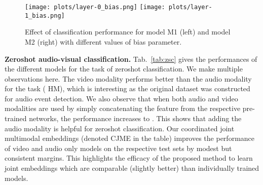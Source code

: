 \begin{figure}
\centering
	\texttt{[image: plots/layer-0\_bias.png]}
	\texttt{[image: plots/layer-1\_bias.png]}
\caption{Effect of classification performance for model M1 (left) and model M2 (right) with different values of bias parameter.
}
\label{fig:bias_corr}
\end{figure}
\begin{table}
\centering
{}
\caption{Zeroshot classification performances (\% mAcc) achieved with audio only, video only, and both audio and video used for training and test. Note that the audio and video concatenation model requires both the modalities to be available during testing.}
\label{tab:zsc}
\vspace{-1 em}
\end{table}
\vspace{0.5em}
\textbf{Zeroshot audio-visual classification.}
Tab.~\ref{tab:zsc} gives the performances of the different models for the task of zeroshot classification. We make multiple observations here. The video modality performs better than the audio modality for the task ( \vs  HM), which is interesting as the original dataset was constructed for audio event detection. We also observe that when both audio and video modalities are used by simply concatenating the feature from the respective pre-trained networks, the performance increases to . This shows that adding the audio modality is helpful for zeroshot classification. Our coordinated joint multimodal embeddings (denoted CJME in the table) improves the performance of video and audio only models on the respective test sets by modest but consistent margins. This highlights the efficacy of the proposed method to learn joint embeddings which are comparable (slightly better) than individually trained models.


